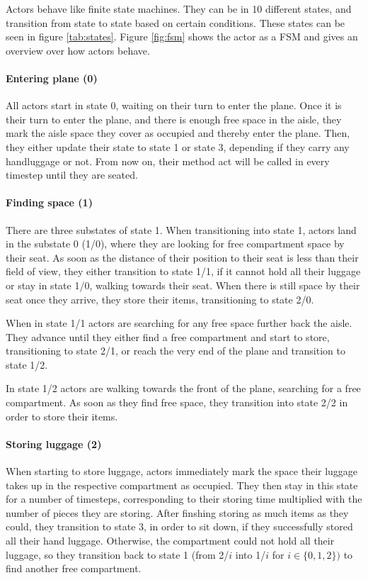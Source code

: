 \documentclass[11pt]{article}
\begin{document}
Actors behave like finite state machines. They can be in 10 different states, and transition from state to state based on certain conditions. These states can be seen in figure \ref{tab:states}. Figure \ref{fig:fsm} shows the actor as a FSM and gives an overview over how actors behave.

\paragraph{Entering plane (0)} All actors start in state 0, waiting on their turn to enter the plane. Once it is their turn to enter the plane, and there is enough free space in the aisle, they mark the aisle space they cover as occupied and thereby enter the plane. Then, they either update their state to state 1 or state 3, depending if they carry any handluggage or not. From now on, their method act will be called in every timestep until they are seated.

\paragraph{Finding space (1)}
There are three substates of state 1. When transitioning into state 1, actors land in the substate 0 (1/0), where they are looking for free compartment space by their seat. As soon as the distance of their position to their seat is less than their field of view, they either transition to state 1/1, if it cannot hold all their luggage or stay in state 1/0, walking towards their seat. When there is still space by their seat once they arrive, they store their items, transitioning to state 2/0.

When in state 1/1 actors are searching for any free space further back the aisle. They advance until they either find a free compartment and start to store, transitioning to state 2/1, or reach the very end of the plane and transition to state 1/2.

In state 1/2 actors are walking towards the front of the plane, searching for a free compartment. As soon as they find free space, they transition into state 2/2 in order to store their items.

\paragraph{Storing luggage (2)}
When starting to store luggage, actors immediately mark the space their luggage takes up in the respective compartment as occupied. They then stay in this state for a number of timesteps, corresponding to their storing time multiplied with the number of pieces they are storing. After finshing storing as much items as they could, they transition to state 3, in order to sit down, if they successfully stored all their hand luggage. Otherwise, the compartment could not hold all their luggage, so they transition back to state 1 (from 2/$i$ into 1/$i$ for $i \in \{0,1,2\})$ to find another free compartment.
\end{document}
